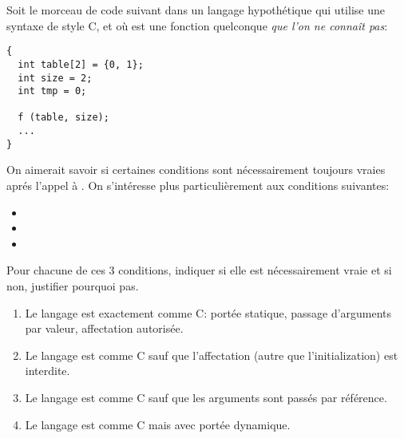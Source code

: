 \begin{Exercise}
\label{ex:raisonner}
  Soit le morceau de code suivant dans un langage hypothétique qui
utilise une syntaxe de style C, et où  est une fonction
quelconque \emph{que l'on ne connaît pas}:
\begin{verbatim}
{
  int table[2] = {0, 1};
  int size = 2;
  int tmp = 0;

  f (table, size);
  ...
}
\end{verbatim}
On aimerait savoir si certaines conditions sont nécessairement
toujours vraies aprés l'appel à .  On s'intéresse plus
particulièrement aux conditions suivantes:
\begin{itemize}
\item {}
\item {}
\item {}
\end{itemize}
Pour chacune de ces 3 conditions, indiquer si elle est nécessairement
vraie et si non, justifier pourquoi pas.

\begin{enumerate}
\item Le langage est exactement comme C: portée statique, passage
  d'arguments par valeur, affectation autorisée.
\item Le langage est comme C sauf que l'affectation (autre que
  l'initialization) est interdite.
\item Le langage est comme C sauf que les arguments sont passés par
  référence.
\item Le langage est comme C mais avec portée dynamique.
\end{enumerate}
\end{Exercise}

